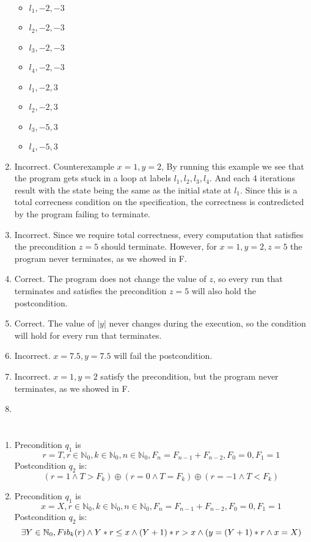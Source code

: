 \documentclass{article}
\begin{document}
\begin{enumerate}[label=\Alph*.]
\begin{itemize}
        \item $l_1, -2, -3$
        \item $l_2, -2, -3$
        \item $l_3, -2, -3$
        \item $l_4, -2, -3$
        \item $l_1, -2, 3$
        \item $l_2, -2, 3$
        \item $l_3, -5, 3$
        \item $l_4, -5, 3$
    \end{itemize}
    \item Incorrect. Counterexample $x=1,y=2$,
    By running this example we see that the program gets stuck in a loop
    at labels $l_1, l_2, l_3, l_4$. And each 4 iterations result with the state
    being the same as the initial state at $l_1$.
    Since this is a total correcness condition on the specification,
    the correctness is contredicted by the program failing to terminate.
    \item Incorrect. Since we require total correctness, every computation that satisfies the precondition $z=5$ should terminate. However, for $x=1, y=2, z=5$ the program never terminates, as we showed in F.
    \item Correct. The program does not change the value of $z$, so every run that terminates and satisfies the precondition $z=5$ will also hold the postcondition.
    \item Correct. The value of $|y|$ never changes during the execution, so the condition will hold for every run that terminates.
    \item Incorrect. $x=7.5, y=7.5$ will fail the postcondition.
    \item Incorrect. $x=1, y=2$ satisfy the precondition, but the program never terminates, as we showed in F.
    \item
\end{enumerate}

\section{}
\begin{enumerate}[label=\Alph*.]
    \item Precondition $q_1$ is $$r=T, r \in \mathbb{N}_0, k \in \mathbb{N}_0, n \in \mathbb{N}_0, F_n = F_{n-1}+F_{n-2}, F_0 = 0, F_1 = 1$$
    Postcondition $q_2$ is: $$(r=1 \wedge T>F_k) \oplus (r=0 \wedge T=F_k) \oplus (r=-1 \wedge T<F_k)$$
    
    \item Precondition $q_1$ is $$x=X, r \in \mathbb{N}_0, k \in \mathbb{N}_0, n \in \mathbb{N}_0, F_n = F_{n-1}+F_{n-2}, F_0 = 0, F_1 = 1$$
    Postcondition $q_2$ is:
    $$ \exists Y \in \mathbb{N}_0, Fib_k(r) \wedge \\
    Y*r\leq x \wedge (Y+1)*r > x \wedge \\
    (y=(Y+1)*r \wedge x=X)$$
\end{enumerate}
\end{document}
